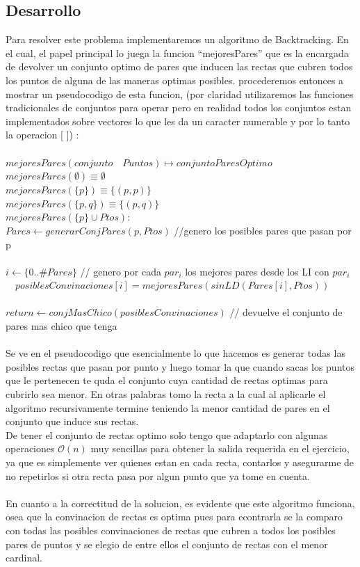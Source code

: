     \subsection{Desarrollo}
    	Para resolver este problema implementaremos un algoritmo de Backtracking. En el cual, el papel principal lo juega la funcion ``mejoresPares'' que es la encargada de devolver un conjunto optimo de pares que inducen las rectas que cubren todos los puntos de alguna de las maneras optimas posibles.
  		procederemos entonces a mostrar un pseudocodigo de esta funcion, (por claridad utilizaremos las funciones tradicionales de conjuntos para operar pero en realidad todos los conjuntos estan implementados sobre vectores lo que les da un caracter numerable y por lo tanto la operacion [ ]) :
  		\\ \\
  		$mejoresPares(conjunto \quad Puntos) \longmapsto conjuntoParesOptimo $\\
  		$mejoresPares(\emptyset) \equiv \emptyset$\\
  		$mejoresPares(\{ p \}) \equiv \{ (p,p) \} $\\
     	$mejoresPares(\{ p,q \}) \equiv \{ (p,q) \} $\\
     	$mejoresPares(\{ p \} \cup Ptos) :$\\
     	$Pares \gets generarConjPares(p,Ptos)$ //genero los posibles pares que pasan por p \\ \\
     	$i \gets \{0..\#Pares\}$  // genero por cada $par_i$ los mejores pares desde los LI con $par_i$
		\\
 		$\quad posiblesConvinaciones[i]=mejoresPares(sinLD(Pares[i],Ptos))$\\ 
 		\\
 		$return \gets conjMasChico(posiblesConvinaciones)$ // devuelve el conjunto de pares mas chico que tenga
		\\
		\\
		Se ve en el pseudocodigo que esencialmente lo que hacemos es generar todas las posibles rectas que pasan por punto y luego tomar la que cuando sacas los puntos que le pertenecen te quda el conjunto cuya cantidad de rectas optimas para cubrirlo sea menor. En otras palabras tomo la recta a la cual al aplicarle el algoritmo recursivamente termine teniendo la menor cantidad de pares en el conjunto que induce sus rectas.\\
		De tener el conjunto de rectas optimo solo tengo que adaptarlo con algunas operaciones $\mathcal{O}(n)$ muy sencillas para obtener la salida requerida en el ejercicio, ya que es simplemente ver quienes estan en cada recta, contarlos y asegurarme de no repetirlos si otra recta pasa por algun punto que ya tome en cuenta.
		\\ 
		\\
		En cuanto a la correctitud de la solucion, es evidente que este algoritmo funciona, osea que la convinacion de rectas es optima pues para econtrarla se la comparo con todas las posibles convinaciones de rectas que cubren a todos los posibles pares de puntos y se elegio de entre ellos el conjunto de rectas con el menor cardinal.


